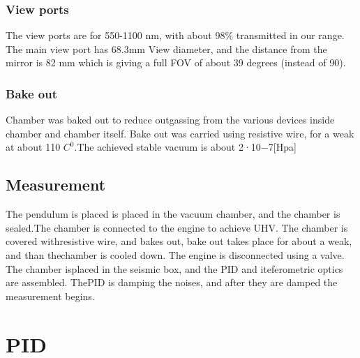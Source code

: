 \documentclass[\main/master.tex]{subfiles}
\begin{document}
\subsubsection{View ports}
The view ports are for 550-1100 nm, with about 98$\%$ transmitted in our range. The main view port has 68.3mm View diameter, and the distance from the mirror is 82 mm which is giving a full FOV of about 39 degrees (instead of 90).
\subsubsection{Bake out}
Chamber was baked out to reduce outgassing from the various devices inside chamber and chamber itself. Bake out was carried using resistive wire, for a weak at about 110 $C^0$.The achieved stable vacuum is about 2·10−7[Hpa]

\subsection{Measurement}
The pendulum is placed is placed in the vacuum chamber, and the chamber is sealed.The chamber is connected to the engine to achieve UHV. The chamber is covered withresistive wire, and bakes out, bake out takes place for about a weak, and than thechamber is cooled down. The engine is disconnected using a valve. The chamber isplaced in the seismic box, and the PID and iteferometric optics are assembled. ThePID is damping the noises, and after they are damped the measurement begins.

\section{PID}
\end{document}
